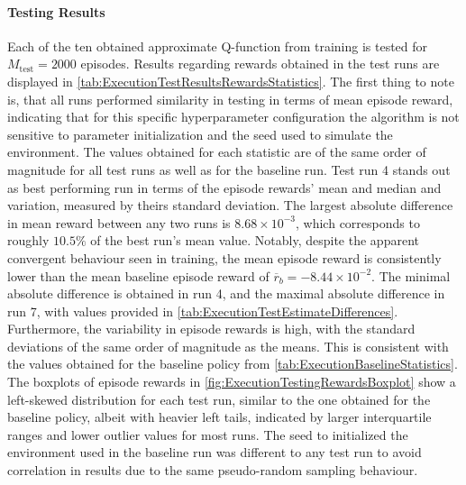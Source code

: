 \documentclass[
    a4paper,
    11pt,
    bibliography=totoc,
    listof=totoc,      
    headinclude=true,
    cleardoublepage=empty,
]{scrbook}
\theoremstyle{plain}
\theoremstyle{definition}
\theoremstyle{remark}
\begin{document}
\clearpage
\paragraph{Testing Results}

Each of the ten obtained approximate Q-function from training is tested for 
$M_\text{test}=2000$ episodes. Results regarding rewards obtained in the test 
runs are displayed in \cref{tab:ExecutionTestResultsRewardsStatistics}. The 
first thing to note is, that all runs performed similarity in testing in terms 
of mean episode reward, indicating that for this specific hyperparameter 
configuration the algorithm is not sensitive to parameter initialization and 
the seed used to simulate the environment. The values obtained for each 
statistic are of the same order of magnitude for all test runs as well as for 
the baseline run. Test run 4 stands out as best performing run in terms of the 
episode rewards' mean and median and variation, measured by theirs standard 
deviation. The largest absolute difference in mean reward between any two runs 
is $8.68\times 10 ^{-3}$, which corresponds to roughly $10.5\%$ of the best 
run's mean value. Notably, despite the apparent convergent behaviour seen in 
training, the mean episode reward is consistently lower than the mean baseline 
episode reward of $\overline r_b=-8.44 \times 10^{-2}$. The minimal absolute 
difference is obtained in run 4, and the maximal absolute difference in run 7, 
with values provided in \cref{tab:ExecutionTestEstimateDifferences}. Furthermore, the 
variability in episode rewards is high, with the standard deviations of the 
same order of magnitude as the means. This is consistent with the values 
obtained for the baseline policy from \cref{tab:ExecutionBaselineStatistics}. 
The boxplots of episode rewards in \cref{fig:ExecutionTestingRewardsBoxplot} 
show a left-skewed distribution for each test run, similar to the one obtained 
for the baseline policy, albeit with heavier left tails, indicated by larger 
interquartile ranges and lower outlier values for most runs. The seed to 
initialized the environment used in the baseline run was different to any test 
run to avoid correlation in results due to the same pseudo-random sampling 
behaviour.
\end{document}
